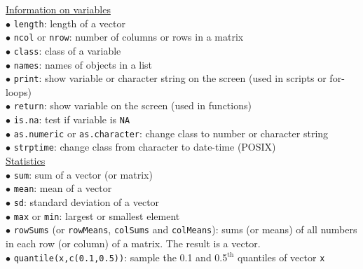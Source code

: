 \documentclass[a4paper,11pt,twocolumn,tablecaptionabove]{scrartcl}
\begin{document}
\noindent \underline{Information on variables}\\
$\bullet$ \texttt{length}: length of a vector\\
$\bullet$ \texttt{ncol} or \texttt{nrow}: number of columns or rows in a matrix\\
$\bullet$ \texttt{class}: class of a variable \\
$\bullet$ \texttt{names}: names of objects in a list \\
$\bullet$ \texttt{print}: show variable or character string on the screen (used in scripts or for-loops) \\
$\bullet$ \texttt{return}: show variable on the screen (used in functions) \\
$\bullet$ \texttt{is.na}: test if variable is \texttt{NA}\\
$\bullet$ \texttt{as.numeric} or \texttt{as.character}: change class to number or character string\\
$\bullet$ \texttt{strptime}: change class from character to date-time (POSIX)\\

\noindent \underline{Statistics}\\
$\bullet$ \texttt{sum}: sum of a vector (or matrix)\\
$\bullet$ \texttt{mean}: mean of a vector\\
$\bullet$ \texttt{sd}: standard deviation of a vector\\
$\bullet$ \texttt{max} or \texttt{min}: largest or smallest element\\
$\bullet$ \texttt{rowSums} (or \texttt{rowMeans}, \texttt{colSums} and \texttt{colMeans}): 
sums (or means) of all numbers in each row (or column) of a matrix. The result is a vector.\\
$\bullet$ \texttt{quantile(x,c(0.1,0.5))}: sample the 0.1 and 0.5$\mathrm{^{th}}$ quantiles of vector \texttt{x}\\
\end{document}
